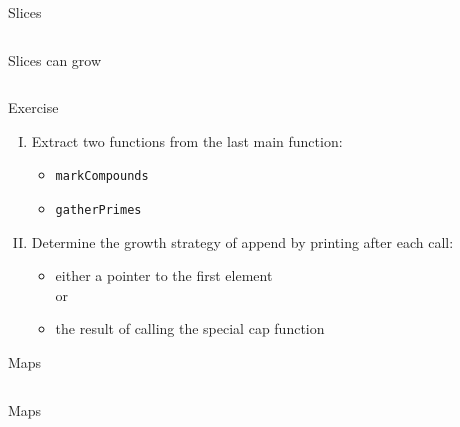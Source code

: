 \documentclass[10pt]{beamer}
\begin{document}
	
	\begin{frame}[t,fragile]{Slices}
		\inputminted{go}{code/05_slices.go}
	\end{frame}
	
	
	\begin{frame}[t,fragile]{Slices can grow}
		\inputminted{go}{code/06_sieve.go}
	\end{frame}
	
	
	\begin{frame}[fragile]{Exercise}
		\begin{enumerate}[I.]
			\item Extract two functions from the last main function:
				\begin{itemize}
					\item \texttt{markCompounds}
					\item \texttt{gatherPrimes}
				\end{itemize}
			\item Determine the growth strategy of append by printing after each call:
				\begin{itemize}
					\item either a pointer to the first element\\
					or\\
					\item the result of calling the special cap function
				\end{itemize}
		\end{enumerate}
	\end{frame}
		
	
	\begin{frame}[t,fragile]{Maps}
		\inputminted{go}{code/07_maps.go}
	\end{frame}
			
	
	\begin{frame}[t,fragile]{Maps}
		\inputminted{go}{code/07b_maps.go}
	\end{frame}
	
	
\end{document}
